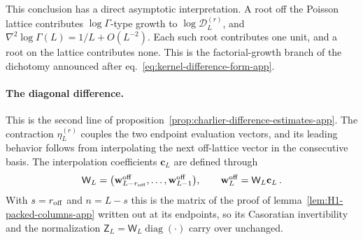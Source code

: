 \documentclass[a4paper,11pt]{article}
\theoremstyle{definition}
\theoremstyle{remark}
\newcommand{\diag}{\operatorname{diag}}
\begin{document}
This conclusion has a direct asymptotic interpretation. 
 A root off the Poisson lattice contributes $\log\Gamma$-type
growth to $\log\mathcal D_L^{(r)}$, and $\nabla^2\log\Gamma(L)=1/L+O(L^{-2})$. Each such root
contributes one unit, and a root on the lattice contributes none. This is the factorial-growth
branch of the dichotomy announced after eq.~\eqref{eq:kernel-difference-form-app}.

\paragraph{The diagonal difference.}
This is the second line of
proposition~\ref{prop:charlier-difference-estimates-app}. The contraction $\eta_L^{(r)}$ couples
the two endpoint evaluation vectors, and its leading behavior follows from interpolating the next
off-lattice vector in the consecutive basis.
The interpolation coefficients $\mathbf c_L$ are defined through
\begin{equation}
   \mathsf W_L
   =
   \bigl(
      \mathbf w_{L-r_{\rm off}}^{\rm off},
      \ldots,
      \mathbf w_{L-1}^{\rm off}
   \bigr),
   \qquad
   \mathbf w_L^{\rm off}
   =\mathsf W_L\mathbf c_L\,.
\end{equation}
With $s=r_{\rm off}$ and $n=L-s$ this is the matrix of the proof of
lemma~\ref{lem:H1-packed-columns-app} written out at its endpoints, so its Casoratian
invertibility and the normalization $\mathsf Z_L=\mathsf W_L\diag(\cdot)$ carry over unchanged.
\end{document}
